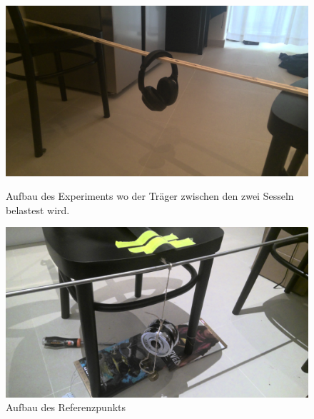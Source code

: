 \documentclass[11pt,ngerman]{scrartcl}
\begin{document}
\begin{figure}[H]
    \centering
    \begin{minipage}[htbp]{\linewidth}
        \begin{minipage}[htbp]{.45\linewidth} %
            \includegraphics[width=\linewidth]{pics/aufbau1.jpg}
        \caption[Aufbau des Experiments]{Aufbau des Experiments wo der Träger
        zwischen den zwei Sesseln belastest wird.}
        \label{fig:aufbau}
        \end{minipage}
        \begin{minipage}[htbp]{.50\linewidth} %
            \includegraphics[width=\linewidth]{pics/aufbau2.jpg}
        \caption[Aufbau des Experiments Schuhlöffel]{Aufbau des Referenzpunkts}
        \label{fig:schuhloffel}
        \end{minipage}
    \end{minipage}
 \end{figure}
\end{document}
